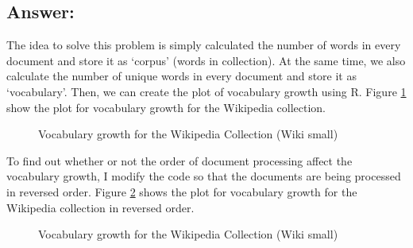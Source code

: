 \documentclass[letterpaper,11pt]{article}
\begin{document}
\subsection*{Answer:}
The idea to solve this problem is simply calculated the number of words in every document and store it as `corpus' (words in collection). At the same time, we also calculate the number of unique words in every document and store it as `vocabulary'. 
Then, we can create the plot of vocabulary growth using R. Figure \ref{fig:4_2_ascending} show the plot for vocabulary growth for the Wikipedia collection. 

\begin{figure}[H]
	\centering
	\caption{Vocabulary growth for the Wikipedia Collection (Wiki small)}
	\label{fig:4_2_ascending}
\end{figure}

To find out whether or not the order of document processing affect the vocabulary growth, I modify the code so that the documents are being processed in reversed order. Figure \ref{fig:4_2_reverse} shows the plot for vocabulary growth for the Wikipedia collection in reversed order. 
\begin{figure}[H]
	\centering
	\caption{Vocabulary growth for the Wikipedia Collection (Wiki small)}
	\label{fig:4_2_reverse}
\end{figure}
\end{document}
